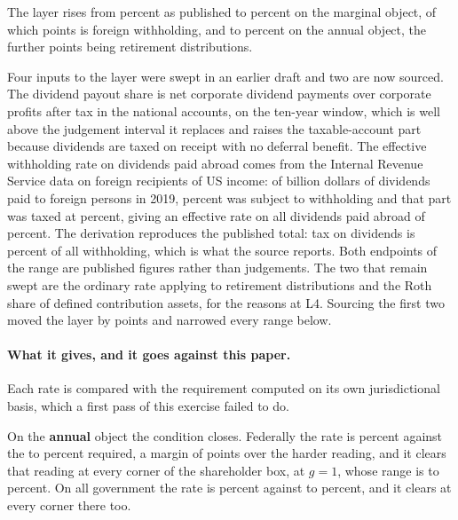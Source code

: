 The layer rises from  percent as published to
 percent on the marginal object, of which
 points is foreign withholding, and to 
percent on the annual object, the further  points being retirement
distributions.

Four inputs to the layer were swept in an earlier draft and two are now sourced. The dividend
payout share is net corporate dividend payments over corporate profits after tax in the national
accounts,  on the ten-year window, which is well above the judgement
interval it replaces and raises the taxable-account part because dividends are taxed on receipt
with no deferral benefit. The effective withholding rate on dividends paid abroad comes from the
Internal Revenue Service data on foreign recipients of US income: of  billion
dollars of dividends paid to foreign persons in 2019,  percent was subject
to withholding and that part was taxed at  percent, giving an effective rate on
all dividends paid abroad of  percent. The derivation reproduces the published
total: tax on dividends is  percent of all withholding, which is what
the source reports. Both endpoints of the range are published figures rather than judgements.
The two that remain swept are the ordinary rate applying to retirement distributions and the Roth
share of defined contribution assets, for the reasons at L4. Sourcing the first two moved the
layer by  points and narrowed every range below.

\paragraph{What it gives, and it goes against this paper.} Each rate is compared with the
requirement computed on its own jurisdictional basis, which a first pass of this exercise failed
to do.

On the \textbf{annual} object the condition closes. Federally the rate is
 percent against the  to 
percent required, a margin of  points over the harder reading, and it
clears that reading at every corner of the shareholder box, at $g = 1$, whose range is
 to  percent. On all government the rate is
 percent against  to
 percent, and it clears at every corner there too.

